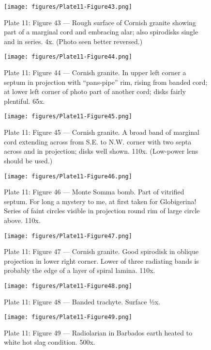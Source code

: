 \documentclass[a4paper, 12pt, oneside]{article}
\begin{document}
\clearpage
\begin{figure}[b]
\centering
\texttt{[image: figures/Plate11-Figure43.png]}
\caption{\small Plate 11: Figure 43 --- Rough surface of Cornish granite showing part of a marginal cord and embracing alar; also spirodisks single and in series. 4x. (Photo seen better reversed.)}
\end{figure}
\clearpage
\begin{figure}[b]
\centering
\texttt{[image: figures/Plate11-Figure44.png]}
\caption{\small Plate 11: Figure 44 --- Cornish granite. In upper left corner a septum in projection with ``pans-pipe'' rim, rising from banded cord; at lower left corner of photo part of another cord; disks fairly plentiful. 65x.}
\end{figure}
\clearpage
\begin{figure}[b]
\centering
\texttt{[image: figures/Plate11-Figure45.png]}
\caption{\small Plate 11: Figure 45 --- Cornish granite. A broad band of marginal cord extending across from S.E. to N.W. corner with two septa across and in projection; disks well shown. 110x. (Low-power lens should be used.)}
\end{figure}
\clearpage
\begin{figure}[b]
\centering
\texttt{[image: figures/Plate11-Figure46.png]}
\caption{\small Plate 11: Figure 46 --- Monte Somma bomb. Part of vitrified septum. For long a mystery to me, at first taken for Globigerina! Series of faint circles visible in projection round rim of large circle above. 110x.}
\end{figure}
\clearpage
\begin{figure}[b]
\centering
\texttt{[image: figures/Plate11-Figure47.png]}
\caption{\small Plate 11: Figure 47 --- Cornish granite. Good spirodisk in oblique projection in lower right corner. Lower of three radiating bands is probably the edge of a layer of spiral lamina. 110x.}
\end{figure}
\clearpage
\begin{figure}[b]
\centering
\texttt{[image: figures/Plate11-Figure48.png]}
\caption{\small Plate 11: Figure 48 --- Banded trachyte. Surface ½x.}
\end{figure}
\clearpage
\begin{figure}[b]
\centering
\texttt{[image: figures/Plate11-Figure49.png]}
\caption{\small Plate 11: Figure 49 --- Radiolarian in Barbados earth heated to white hot slag condition. 500x.}
\end{figure}
\end{document}

